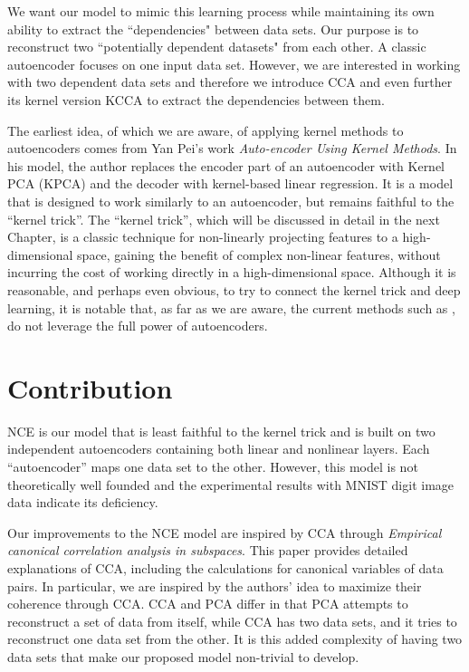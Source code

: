 \documentclass[12pt]{report} %
\begin{document}
We want our model to mimic this learning process while maintaining its own ability to extract the ``dependencies" between data sets. Our purpose is to reconstruct two ``potentially dependent datasets" from each other. A classic autoencoder focuses on one input data set. However, we are interested in working with two dependent data sets and therefore we introduce CCA and even further its kernel version KCCA to extract the dependencies between them. 

The earliest idea, of which we are aware, of applying kernel methods to autoencoders comes from Yan Pei's work \textit{Auto-encoder Using Kernel Methods}\cite{AUKM}. In his model, the author replaces the encoder part of an autoencoder with Kernel PCA (KPCA)\cite{KPCA} and the decoder with kernel-based linear regression. It is a model that is designed to work similarly to an autoencoder, but remains faithful to the ``kernel trick''. The ``kernel trick'', which will be discussed in detail in the next Chapter, is a classic technique for non-linearly projecting features to a high-dimensional space, gaining the benefit of complex non-linear features, without incurring the cost of working directly in a high-dimensional space. Although it is reasonable, and perhaps even obvious, to try to connect the kernel trick and deep learning, it is notable that, as far as we are aware, the current methods such as \cite{AUKM}, do not leverage the full power of autoencoders.

\section{Contribution}
NCE is our model that is least faithful to the kernel trick and is built on two independent autoencoders containing both linear and nonlinear layers. Each ``autoencoder'' maps one data set to the other. However, this model is not theoretically well founded and the experimental results with MNIST digit image data indicate its deficiency. 

Our improvements to the NCE model are inspired by CCA through \textit{Empirical canonical correlation analysis in subspaces}\cite{ECCA}. This paper provides detailed explanations of CCA, including the calculations for canonical variables of data pairs. In particular, we are inspired by the authors' idea to maximize their coherence through CCA. CCA and PCA differ in that PCA attempts to reconstruct a set of data from itself, while CCA has two data sets, and it tries to reconstruct one data set from the other. It is this added complexity of having two data sets that make our proposed model non-trivial to develop.
\end{document}
